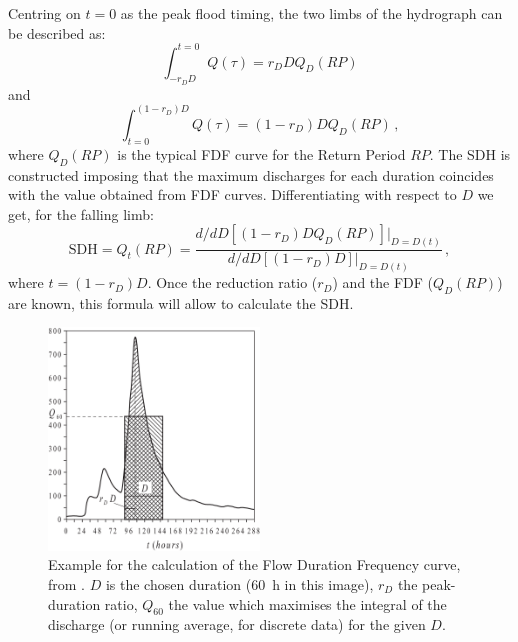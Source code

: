 Centring on $t=0$ as the peak flood timing, the two limbs of the hydrograph can be described as:
\begin{equation}
  \int^{t=0}_{-r_DD} Q\left(\tau \right) = r_D D Q_D\left(RP \right)
\end{equation}
and
\begin{equation}
  \int^{\left(1-r_D\right)D}_{t=0} Q\left(\tau \right) = \left(1-r_D\right) D Q_D\left(RP \right) \,,
\end{equation}
where $Q_D\left(RP \right)$ is the typical FDF curve for the Return Period $RP$. The SDH is constructed imposing that the maximum discharges for each duration coincides with the value obtained from FDF curves. Differentiating with respect to $D$ we get, for the falling limb:
\begin{equation}\label{eq:sdh}
  \text{SDH} = Q_t \left( RP \right) = \frac{d/dD \left[ \left( 1-r_D\right) D Q_D\left(RP\right)\right]|_{D=D\left(t\right)}}{d/dD \left[ \left( 1-r_D\right) D \right]|_{D=D\left(t\right)}}\,,
\end{equation}
where $t=\left( 1-r_D\right)D$. Once the reduction ratio ($r_D$) and the FDF ($Q_D\left( RP\right)$) are known, this formula will allow to calculate the SDH.\\
\begin{figure}
    \centering
    \includegraphics[width=0.5\textwidth]{figures/maione}
    \decoRule
    \caption[Example for the calculation of the Flow Duration Frequency curve]{
    Example for the calculation of the Flow Duration Frequency curve, from \citep[][figure 1]{Maione2003}. $D$ is the chosen duration (\SI{60}{\hour} in this image), $r_D$ the peak-duration ratio, $Q_{60}$ the value which maximises the integral of the discharge (or running average, for discrete data) for the given $D$.
    }\label{fig:example_rd_maione}
\end{figure}
